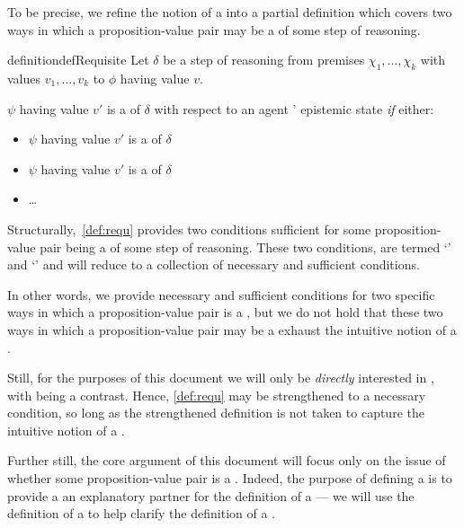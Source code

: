 \begin{note}
  To be precise, we refine the notion of a \requ{} into a partial definition which covers two ways in which a proposition-value pair may be a \requ{} of some step of reasoning.

  \begin{restatable}{definition}{defRequisite}
    \label{def:requ}
    Let \(\delta\) be a step of reasoning from premises \(\chi_{1},\dots,\chi_{k}\) with values \(v_{1},\dots,v_{k}\) to \(\phi\) having value \(v\).

    \(\psi\) having value \(v'\) is a \emph{\requ{}} of \(\delta\) with respect to an agent \vAgent{}' epistemic state \emph{if} either:
    \begin{itemize}
    \item \(\psi\) having value \(v'\) is a \emph{\crequ{}} of \(\delta\)
    \item \(\psi\) having value \(v'\) is a \emph{\prequ{}} of \(\delta\)
    \item \dots
    \end{itemize}
  \end{restatable}
\end{note}

\begin{note}
  Structurally,~\autoref{def:requ} provides two conditions sufficient for some proposition-value pair being a \requ{} of some step of reasoning.
  These two conditions, are termed `\prequ{}' and `\crequ{}' and will reduce to a collection of necessary and sufficient conditions.

  In other words, we provide necessary and sufficient conditions for two specific ways in which a proposition-value pair is a \requ{}, but we do not hold that these two ways in which a proposition-value pair may be a \requ{} exhaust the intuitive notion of a \requ{}.

  Still, for the purposes of this document we will only be \emph{directly} interested in , with  being a contrast.
  Hence, \autoref{def:requ} may be strengthened to a necessary condition, so long as the strengthened definition is not taken to capture the intuitive notion of a \requ{}.
\end{note}

\begin{note}
  Further still, the core argument of this document will focus only on the issue of whether some proposition-value pair is a .
  Indeed, the purpose of defining a \prequ{} is to provide a an explanatory partner for the definition of a \crequ{} --- we will use the definition of a \prequ{} to help clarify the definition of a \crequ{}.
\end{note}

